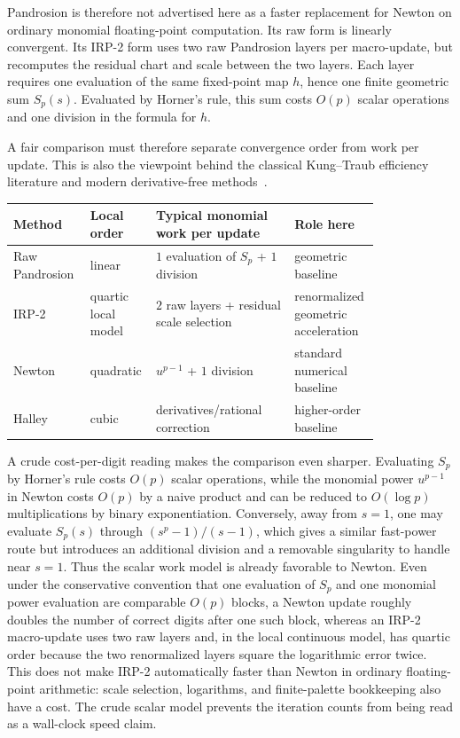 \documentclass[10pt,a4paper]{article}
\theoremstyle{plain}
\theoremstyle{definition}
\theoremstyle{remark}
\begin{document}
Pandrosion is therefore not advertised here as a faster replacement for Newton
on ordinary monomial floating-point computation.  Its raw form is linearly convergent.  Its IRP-2 form uses two raw Pandrosion
layers per macro-update, but recomputes the residual chart and scale between
the two layers.  Each layer requires one evaluation of the same fixed-point map
$h$, hence one finite geometric sum $S_p(s)$.  Evaluated by
Horner's rule, this sum costs $O(p)$ scalar operations and one division in the
formula for $h$.

A fair comparison must therefore separate convergence order from work per
update.  This is also the viewpoint behind the classical Kung--Traub efficiency
literature and modern derivative-free methods~\cite{kungtraub,petkovic2013,cordero2013,sharma2014}.

\begin{center}
\scriptsize
\begin{tabular}{@{}>{\raggedright\arraybackslash}p{0.20\linewidth}>{\raggedright\arraybackslash}p{0.10\linewidth}>{\raggedright\arraybackslash}p{0.36\linewidth}>{\raggedright\arraybackslash}p{0.16\linewidth}@{}}
\toprule
Method & Local order & Typical monomial work per update & Role here \\
\midrule
Raw Pandrosion & linear & $1$ evaluation of $S_p$ + $1$ division & geometric baseline \\
IRP-2 & quartic local model & $2$ raw layers + residual scale selection & renormalized geometric acceleration \\
Newton & quadratic & $u^{p-1}$ + $1$ division & standard numerical baseline \\
Halley & cubic & derivatives/rational correction & higher-order baseline \\
\bottomrule
\end{tabular}
\end{center}

A crude cost-per-digit reading makes the comparison even sharper.  Evaluating
$S_p$ by Horner's rule costs $O(p)$ scalar operations, while the monomial power
$u^{p-1}$ in Newton costs $O(p)$ by a naive product and can be reduced to
$O(\log p)$ multiplications by binary exponentiation.  Conversely, away from
$s=1$, one may evaluate $S_p(s)$ through $(s^p-1)/(s-1)$, which gives a similar
fast-power route but introduces an additional division and a removable
singularity to handle near $s=1$.  Thus the scalar work model is already
favorable to Newton.  Even under the conservative convention that one evaluation
of $S_p$ and one monomial power evaluation are comparable $O(p)$ blocks, a
Newton update roughly doubles the number of correct digits
after one such block, whereas an IRP-2 macro-update uses two raw layers and,
in the local continuous model, has quartic order because the two renormalized
layers square the logarithmic error twice.  This does not make IRP-2
automatically faster than Newton in ordinary floating-point arithmetic: scale
selection, logarithms, and finite-palette bookkeeping also have a cost.  The
crude scalar model prevents the iteration counts from being read as a wall-clock
speed claim.
\end{document}
